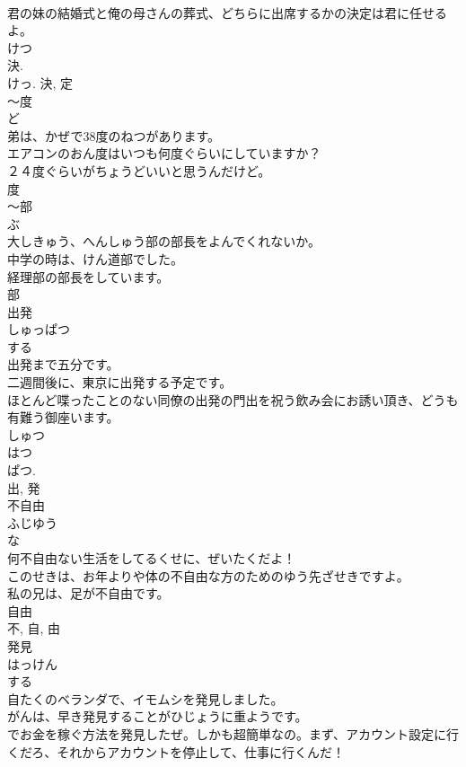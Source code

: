 \documentclass[8pt]{extreport}
\begin{document}
\begin{CJK}{UTF8}{min}
\\	君の妹の結婚式と俺の母さんの葬式、どちらに出席するかの決定は君に任せるよ。	
\\	けつ 
\\	決. 
\\	けっ.	決, 定	
\\	〜度	
\\	ど	
\\	弟は、かぜで38度のねつがあります。	
\\	エアコンのおん度はいつも何度ぐらいにしていますか？	
\\	２４度ぐらいがちょうどいいと思うんだけど。	
\\	度	
\\	〜部	
\\	ぶ	
\\	大しきゅう、へんしゅう部の部長をよんでくれないか。	
\\	中学の時は、けん道部でした。	
\\	経理部の部長をしています。	
\\	部	
\\	出発	
\\	しゅっぱつ	
\\	する 
\\	出発まで五分です。	
\\	二週間後に、東京に出発する予定です。	
\\	ほとんど喋ったことのない同僚の出発の門出を祝う飲み会にお誘い頂き、どうも有難う御座います。	
\\	しゅつ 
\\	はつ 
\\	ぱつ. 
\\	出, 発	
\\	不自由	
\\	ふじゆう	
\\	な 
\\	何不自由ない生活をしてるくせに、ぜいたくだよ！	
\\	このせきは、お年よりや体の不自由な方のためのゆう先ざせきですよ。	
\\	私の兄は、足が不自由です。	
\\	自由 
\\	不, 自, 由	
\\	発見	
\\	はっけん	
\\	する 
\\	自たくのベランダで、イモムシを発見しました。	
\\	がんは、早き発見することがひじょうに重ようです。	
\\	でお金を稼ぐ方法を発見したぜ。しかも超簡単なの。まず、アカウント設定に行くだろ、それからアカウントを停止して、仕事に行くんだ！	

\end{CJK}
\end{document}
